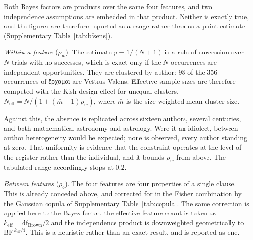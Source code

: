 \documentclass[11pt,a4paper]{article}
\newcommand{\grk}[1]{{\fontencoding{LGR}\selectfont #1}}
\newcommand{\grk}[1]{{\greekfont #1}}
\begin{document}
Both Bayes factors are products over the same four features, and two
independence assumptions are embedded in that product. Neither is exactly
true, and the figures are therefore reported as a range rather than as a point
estimate (Supplementary Table~\ref{tab:bfsens}).

\emph{Within a feature} ($\rho_w$). The estimate $p = 1/(N+1)$ is a rule of
succession over $N$ trials with no successes, which is exact only if the $N$
occurrences are independent opportunities. They are clustered by author: 98 of
the 356 occurrences of \grk{ἔρχομαι} are Vettius Valens. Effective sample sizes
are therefore computed with the Kish design effect for unequal clusters,
$N_\mathrm{eff} = N / \left(1 + (\bar m - 1)\rho_w\right)$, where $\bar m$ is
the size-weighted mean cluster size.

Against this, the absence is replicated across sixteen authors, several
centuries, and both mathematical astronomy and astrology. Were it an idiolect,
between-author heterogeneity would be expected; none is observed, every author
standing at zero. That uniformity is evidence that the constraint operates at
the level of the register rather than the individual, and it bounds $\rho_w$
from above. The tabulated range accordingly stops at $0.2$.

\emph{Between features} ($\rho_b$). The four features are four properties of a
single clause. This is already conceded above, and corrected for in the Fisher
combination by the Gaussian copula of Supplementary Table~\ref{tab:copula}. The same
correction is applied here to the Bayes factor: the effective feature count is
taken as $k_\mathrm{eff} = \mathrm{df}_\mathrm{Brown}/2$ and the
independence product is downweighted geometrically to
$\mathrm{BF}^{\,k_\mathrm{eff}/4}$. This is a heuristic rather than an exact
result, and is reported as one.
\end{document}
